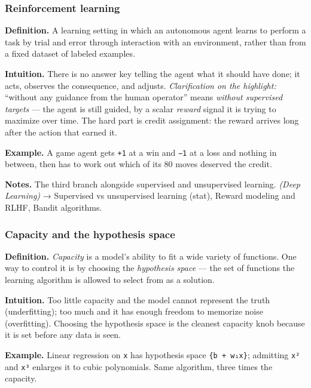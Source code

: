 \documentclass[
  10pt,
  letterpaper,
  onecolumn]{article}
\begin{document}
\hypertarget{reinforcement-learning}{%
\subsubsection{Reinforcement learning}\label{reinforcement-learning}}

\textbf{Definition.} A learning setting in which an autonomous agent
learns to perform a task by trial and error through interaction with an
environment, rather than from a fixed dataset of labeled examples.

\textbf{Intuition.} There is no answer key telling the agent what it
should have done; it acts, observes the consequence, and adjusts.
\emph{Clarification on the highlight:} ``without any guidance from the
human operator'' means \emph{without supervised targets} --- the agent
is still guided, by a scalar \emph{reward} signal it is trying to
maximize over time. The hard part is credit assignment: the reward
arrives long after the action that earned it.

\textbf{Example.} A game agent gets \texttt{+1} at a win and
\texttt{−1} at a loss and nothing in between, then has to work out which
of its 80 moves deserved the credit.

\textbf{Notes.} The third branch alongside supervised and unsupervised
learning. \emph{(Deep Learning)} → Supervised vs unsupervised learning
(stat), Reward modeling and RLHF, Bandit algorithms.

\hypertarget{capacity-and-the-hypothesis-space}{%
\subsubsection{Capacity and the hypothesis
space}\label{capacity-and-the-hypothesis-space}}

\textbf{Definition.} \emph{Capacity} is a model's ability to fit a wide
variety of functions. One way to control it is by choosing the
\emph{hypothesis space} --- the set of functions the learning algorithm
is allowed to select from as a solution.

\textbf{Intuition.}  Too little capacity and the model cannot represent
the truth (underfitting); too much and it has enough freedom to memorize
noise (overfitting). Choosing the hypothesis space is the cleanest
capacity knob because it is set before any data is seen.

\textbf{Example.} Linear regression on \texttt{x} has hypothesis space
\texttt{\{b\ +\ w₁x\}}; admitting \texttt{x²} and \texttt{x³} enlarges
it to cubic polynomials. Same algorithm, three times the capacity.
\end{document}
